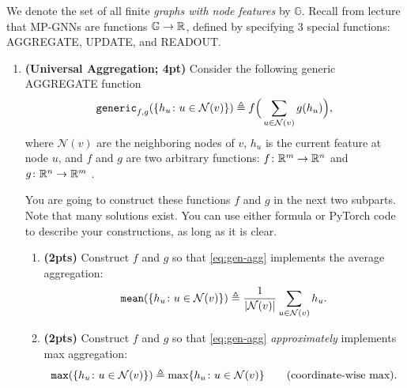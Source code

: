 \documentclass[12pt,letterpaper]{article}
\begin{document}
We denote the set of all finite \emph{graphs with node features} by $\mathbb{G}$. Recall from lecture that MP-GNNs are functions $\mathbb{G} \to \mathbb{R}$, defined by specifying $3$ special functions: AGGREGATE, UPDATE, and READOUT.

\begin{enumerate}[resume]
    \item \textbf{(Universal Aggregation; 4pt)} Consider the following generic AGGREGATE function \begin{equation}
        \texttt{generic}_{f,g}(\{h_u \colon u \in \mathcal{N}(v)\}) \triangleq f \Big(\sum_{ u \in \mathcal{N}(v)} g(h_u)\Big),\label{eq:gen-agg}
    \end{equation}
    where $\mathcal{N}(v)$ are the neighboring nodes of $v$, $h_u$ is the current feature at node $u$, and $f$ and $g$ are two arbitrary functions: $f \colon \mathbb{R}^m \rightarrow \mathbb{R}^n$ and $g \colon \mathbb{R}^n \rightarrow \mathbb{R}^m$ .
    
    You are going to construct these functions $f$ and $g$ in the next two subparts. Note that many solutions exist. You can use either formula or PyTorch code to describe your constructions, as long as it is clear. \begin{enumerate}
        \item \textbf{(2pts)} Construct $f$ and $g$ so that \cref{eq:gen-agg} implements the average aggregation: \begin{equation}
            \texttt{mean}(\{h_u \colon u \in \mathcal{N}(v)\}) \triangleq \frac{1}{\lvert{\mathcal{N}(v)}\rvert} \sum_{ u \in \mathcal{N}(v)} h_u.
        \end{equation}
        

        \item \textbf{(2pts)} Construct $f$ and $g$ so that \cref{eq:gen-agg} \emph{approximately} implements max aggregation: \begin{equation}
            \texttt{max}(\{h_u \colon u \in \mathcal{N}(v)\}) \triangleq \max\{ h_u \colon u \in \mathcal{N}(v) \} \tag{coordinate-wise max}.
        \end{equation}
        
    \end{enumerate}


\end{enumerate}
\end{document}
